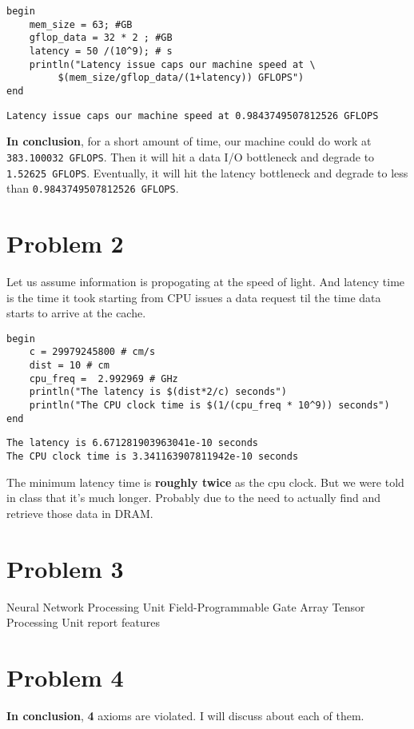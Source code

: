 \documentclass[11pt]{article}
\begin{document}
\begin{verbatim}
begin
    mem_size = 63; #GB
    gflop_data = 32 * 2 ; #GB
    latency = 50 /(10^9); # s
    println("Latency issue caps our machine speed at \
         $(mem_size/gflop_data/(1+latency)) GFLOPS")
end
\end{verbatim}

\begin{verbatim}
Latency issue caps our machine speed at 0.9843749507812526 GFLOPS
\end{verbatim}



\textbf{In conclusion}, for a short amount of time, our machine could do work at
\texttt{383.100032 GFLOPS}. Then it will hit a data I/O bottleneck and degrade to
\texttt{1.52625 GFLOPS}. Eventually, it will hit the latency bottleneck and degrade to
less than \texttt{0.9843749507812526 GFLOPS}.

\section{Problem 2}
\label{sec:orgeac4458}
Let us assume information is propogating at the speed of light. And latency time
is the time it took starting from CPU issues a data request til the time data
starts to arrive at the cache.

\begin{verbatim}
begin
    c = 29979245800 # cm/s
    dist = 10 # cm
    cpu_freq =  2.992969 # GHz
    println("The latency is $(dist*2/c) seconds")
    println("The CPU clock time is $(1/(cpu_freq * 10^9)) seconds")
end
\end{verbatim}

\begin{verbatim}
The latency is 6.671281903963041e-10 seconds
The CPU clock time is 3.341163907811942e-10 seconds
\end{verbatim}


The minimum latency time is \textbf{roughly twice} as the cpu clock. But we were told
in class that it's much longer. Probably due to the need to actually find and
retrieve those data in DRAM.

\section{Problem 3}
\label{sec:org955073b}
Neural Network Processing Unit
Field-Programmable Gate Array
Tensor Processing Unit
report features

\section{Problem 4}
\label{sec:org9fb89da}
\textbf{In conclusion}, \textbf{4} axioms are violated. I will discuss about each of them.
\end{document}
